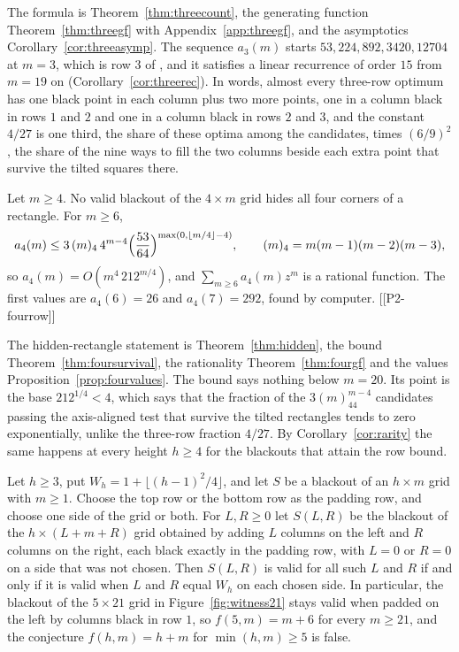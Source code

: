 The formula is Theorem~\ref{thm:threecount}, the generating function
Theorem~\ref{thm:threegf} with Appendix~\ref{app:threegf}, and the asymptotics
Corollary~\ref{cor:threeasymp}. The sequence $a_3(m)$ starts
$53,224,892,3420,12704$ at $m=3$, which is row $3$ of , and it
satisfies a linear recurrence of order $15$ from $m=19$ on
(Corollary~\ref{cor:threerec}). In words, almost every three-row optimum has one
black point in each column plus two more points, one in a column black in rows $1$
and $2$ and one in a column black in rows $2$ and $3$, and the constant $4/27$ is one
third, the share of these optima among the candidates, times $(6/9)^2$, the share of
the nine ways to fill the two columns beside each extra point that survive the tilted
squares there.

\begin{thmC}
Let $m\ge4$. No valid blackout of the $4\times m$ grid hides all four corners of a
rectangle. For $m\ge6$,
\[
a_4(m)\le3\,(m)_4\,4^{m-4}\Bigl(\frac{53}{64}\Bigr)^{\max(0,\lfloor m/4\rfloor-4)},
\qquad (m)_4=m(m-1)(m-2)(m-3),
\]
so $a_4(m)=O(m^4\,212^{m/4})$, and $\sum_{m\ge6}a_4(m)z^m$ is a rational function.
The first values are $a_4(6)=26$ and $a_4(7)=292$, found by computer. [[P2-fourrow]]
\end{thmC}

The hidden-rectangle statement is Theorem~\ref{thm:hidden}, the bound
Theorem~\ref{thm:foursurvival}, the rationality Theorem~\ref{thm:fourgf} and the
values Proposition~\ref{prop:fourvalues}. The bound says nothing below $m=20$. Its
point is the base $212^{1/4}<4$, which says that the fraction of the $3(m)_44^{m-4}$
candidates passing the axis-aligned test that survive the tilted rectangles tends to
zero exponentially, unlike the three-row fraction $4/27$. By
Corollary~\ref{cor:rarity} the same happens at every height $h\ge4$ for the
blackouts that attain the row bound.

\begin{thmD}
Let $h\ge3$, put $W_h=1+\lfloor(h-1)^2/4\rfloor$, and let $S$ be a blackout of an
$h\times m$ grid with $m\ge1$. Choose the top row or the bottom row as the padding
row, and choose one side of the grid or both. For $L,R\ge0$ let $S(L,R)$ be the
blackout of the $h\times(L+m+R)$ grid obtained by adding $L$ columns on the left and
$R$ columns on the right, each black exactly in the padding row, with $L=0$ or $R=0$
on a side that was not chosen. Then $S(L,R)$ is valid for all such $L$ and $R$ if and
only if it is valid when $L$ and $R$ equal $W_h$ on each chosen side. In particular,
the blackout of the $5\times21$ grid in Figure~\ref{fig:witness21} stays valid when
padded on the left by columns black in row $1$, so $f(5,m)=m+6$ for every $m\ge21$,
and the conjecture $f(h,m)=h+m$ for $\min(h,m)\ge5$ is false.
\end{thmD}

